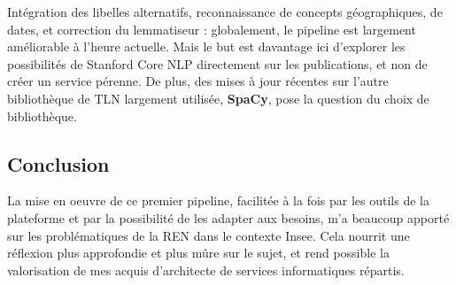 Intégration des libelles alternatifs, reconnaissance de concepts géographiques, de dates, et correction du lemmatiseur : globalement, le pipeline est largement améliorable à l'heure actuelle. Mais le but est davantage ici d'explorer les possibilités de Stanford Core NLP directement sur les publications, et non de créer un service pérenne. De plus, des mises à jour récentes sur l'autre bibliothèque de TLN largement utilisée, \textbf{SpaCy}, pose la question du choix de bibliothèque.
\label{section 2.2.5}

\subsection*{Conclusion}
La mise en oeuvre de ce premier pipeline, facilitée à la fois par les outils de la plateforme et par la possibilité de les adapter aux besoins, m'a beaucoup apporté sur les problématiques de la REN dans le contexte Insee. Cela nourrit une réflexion plus approfondie et plus mûre sur le sujet, et rend possible la valorisation de mes acquis d'architecte de services informatiques répartis.
